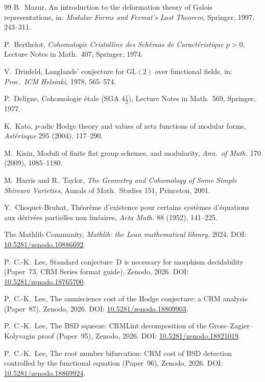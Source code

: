 \documentclass[11pt,a4paper]{article}
\theoremstyle{plain}
\theoremstyle{definition}
\newcommand{\GL}{\mathrm{GL}}
\begin{document}
\begin{thebibliography}{99}
 B.\ Mazur, An introduction to the deformation theory of Galois representations, in: \emph{Modular Forms and Fermat's Last Theorem}, Springer, 1997, 243--311.

 P.\ Berthelot, \emph{Cohomologie Cristalline des Sch\'emas de Caract\'eristique $p > 0$}, Lecture Notes in Math.~407, Springer, 1974.

 V.\ Drinfeld, Langlands' conjecture for $\GL(2)$ over functional fields, in: \emph{Proc.\ ICM Helsinki}, 1978, 565--574.

 P.\ Deligne, Cohomologie \'etale (SGA $4\frac{1}{2}$), Lecture Notes in Math.~569, Springer, 1977.

 K.\ Kato, $p$-adic Hodge theory and values of zeta functions of modular forms, \emph{Ast\'erisque} 295 (2004), 117--290.

 M.\ Kisin, Moduli of finite flat group schemes, and modularity, \emph{Ann.\ of Math.} 170 (2009), 1085--1180.

 M.\ Harris and R.\ Taylor, \emph{The Geometry and Cohomology of Some Simple Shimura Varieties}, Annals of Math.\ Studies 151, Princeton, 2001.

 Y.\ Choquet-Bruhat, Th\'eor\`eme d'existence pour certains syst\`emes d'\'equations aux d\'eriv\'ees partielles non lin\'eaires, \emph{Acta Math.} 88 (1952), 141--225.

 The Mathlib Community, \emph{Mathlib: the Lean mathematical library}, 2024. DOI: \href{https://doi.org/10.5281/zenodo.10886692}{10.5281/zenodo.10886692}.

 P.\ C.-K.\ Lee, Standard conjecture~D is necessary for morphism decidability (Paper~73, CRM Series format guide), Zenodo, 2026. DOI: \href{https://doi.org/10.5281/zenodo.18765700}{10.5281/zenodo.18765700}.


 P.\ C.-K.\ Lee, The omniscience cost of the Hodge conjecture: a CRM analysis (Paper~87), Zenodo, 2026. DOI: \href{https://doi.org/10.5281/zenodo.18809903}{10.5281/zenodo.18809903}.

 P.\ C.-K.\ Lee, The BSD squeeze: CRMLint decomposition of the Gross--Zagier--Kolyvagin proof (Paper~95), Zenodo, 2026. DOI: \href{https://doi.org/10.5281/zenodo.18821019}{10.5281/zenodo.18821019}.

 P.\ C.-K.\ Lee, The root number bifurcation: CRM cost of BSD detection controlled by the functional equation (Paper~96), Zenodo, 2026. DOI: \href{https://doi.org/10.5281/zenodo.18869924}{10.5281/zenodo.18869924}.

\end{thebibliography}
\end{document}
